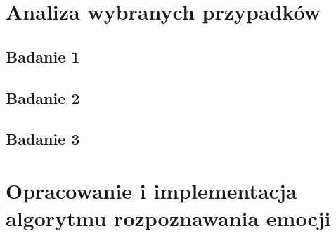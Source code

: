 \documentclass[a4paper,12pt,twoside,openany]{report}
\begin{document}
    \chapter{Analiza wybranych przypadków}

    \section{Badanie 1}

    \section{Badanie 2}
    \section{Badanie 3}

    \chapter{Opracowanie i implementacja algorytmu rozpoznawania emocji}
\end{document}
